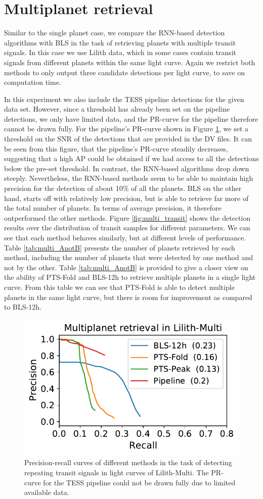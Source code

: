 \section{Multiplanet retrieval}
\label{sec:multis}

Similar to the single planet case, we compare the RNN-based detection algorithms with BLS in the task of retrieving planets with multiple transit signals. In this case we use Lilith data, which in some cases contain transit signals from different planets within the same light curve. Again we restrict both methods to only output three candidate detections per light curve, to save on computation time.

In this experiment we also include the TESS pipeline detections for the given data set. However, since a threshold has already been set on the pipeline detections, we only have limited data, and the PR-curve for the pipeline therefore cannot be drawn fully. For the pipeline's PR-curve shown in Figure \ref{fig:multi_pr}, we set a threshold on the SNR of the detections that are provided in the DV files. It can be seen from this figure, that the pipeline's PR-curve steadily decreases, suggesting that a high AP could be obtained if we had access to all the detections below the pre-set threshold. In contrast, the RNN-based algorithms drop down steeply. Nevertheless, the RNN-based methods seem to be able to maintain high precision for the detection of about 10\% of all the planets. BLS on the other hand, starts off with relatively low precision, but is able to retrieve far more of the total number of planets. In terms of average precision, it therefore outperformed the other methods. Figure \ref{fig:multi_transit} shows the detection results over the distribution of transit samples for different parameters. We can see that each method behaves similarly, but at different levels of performance. Table \ref{tab:multi_AnotB} presents the number of planets retrieved by each method, including the number of planets that were detected by one method and not by the other. Table \ref{tab:multi_AnotB} is provided to give a closer view on the ability of PTS-Fold and BLS-12h to retrieve multiple planets in a single light curve. From this table we can see that PTS-Fold is able to detect multiple planets in the same light curve, but there is room for improvement as compared to BLS-12h.

\begin{figure}
    \centering
    \includegraphics[width=0.35\linewidth]{Experiments/Figures/Multis/multi_pr.pdf}
    \caption{Precision-recall curves of different methods in the task of detecting repeating transit signals in light curves of Lilith-Multi. The PR-curve for the TESS pipeline could not be drawn fully due to limited available data.}
    \label{fig:multi_pr}
\end{figure}

